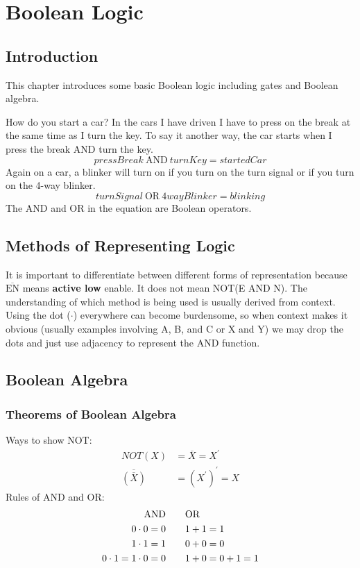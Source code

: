 \chapter{Boolean Logic}

\section{Introduction}
This chapter introduces some basic Boolean logic including gates and Boolean algebra.

How do you start a car? In the cars I have driven I have to press on the break at the 
same time as I turn the key. To say it another way, the car starts when I press the break
AND turn the key.
\begin{equation}
	pressBreak \: \mathrm{AND} \: turnKey = startedCar
\end{equation}
Again on a car, a blinker will turn on if you turn on the turn signal or if you turn on the 4-way blinker.
\begin{equation}
	turnSignal \: \mathrm{OR} \: 4wayBlinker = blinking
\end{equation}
The AND and OR in the equation are Boolean operators. 

\section{Methods of Representing Logic}
It is important to differentiate between different forms of representation because $\overline{\mathrm{EN}}$
means \textbf{active low} enable. It does not mean NOT(E AND N). The understanding of which method is being 
used is usually derived from context. Using the dot ($\cdot$) everywhere can become burdensome, so when context
makes it obvious (usually examples involving A, B, and C or X and Y) we may drop the dots and just use adjacency to represent
the AND function.

\section{Boolean Algebra}

\subsection{Theorems of Boolean Algebra}
Ways to show NOT:
\begin{subequations}
	\begin{align}
	NOT(X) &= \overline{X} = X^{\prime} \\
	\overline{(\overline{X})} &= \left(X^{\prime}\right)^{\prime}= X
	\end{align}
\end{subequations}
Rules of AND and OR:
\begin{subequations}
	\begin{align}
	\mathrm{AND} \qquad & \mathrm{OR}\notag\\
	0\cdot0 = 0 \qquad & 1+1 = 1\\
	1\cdot1 = 1 \qquad & 0+0 = 0\\
	0\cdot1 = 1\cdot0 = 0 \qquad & 1 + 0 = 0 + 1 = 1
	\end{align}
\end{subequations}

